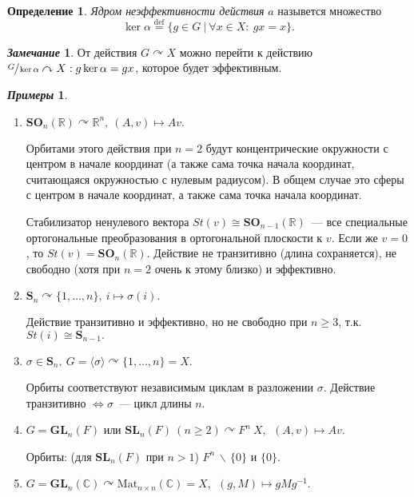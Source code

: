 \documentclass[a4paper, 14pt]{extarticle}
\newcommand{\deq}{\stackrel{\mathrm{def}}{=}}
\newcommand{\n}{\par}
\newcommand{\real}{\mathbb{R}}
\newcommand{\complex}{\mathbb{C}}
\newcommand{\GL}{\mathbf{GL}}
\newcommand{\SL}{\mathbf{SL}}
\newcommand{\SOrth}{\mathbf{SO}}
\newcommand{\symmetrical}{\mathbf{S}}
\newcommand{\suchthat}{{:}{ } \ }
\theoremstyle{definition}
\newtheorem*{exmpls}{\textit{Примеры}}
\newtheorem*{remark}{\textit{Замечание}}
\newtheorem{definition}{Определение}
\theoremstyle{plain}
\numberwithin{theorem}{section}
\numberwithin{definition}{section}
\numberwithin{statement}{section}
\numberwithin{lemma}{section}
\numberwithin{consequence}{section}
\begin{document}
        \begin{definition}
            \textit{Ядром неэффективности действия} $a$ назывется множество 
            \begin{equation*}
                \ker \alpha \deq \{g \in G \ | \ \forall x \in X\suchthat gx = x\}.
            \end{equation*}
        \end{definition}
        \begin{remark}
            От действия ${G \curvearrowright X}$ можно перейти к действию ${\sfrac{G}{\ker \alpha} \curvearrowright X : g \ker \alpha = gx}$, которое будет эффективным.
        \end{remark}
        \begin{exmpls}
            \
            \begin{enumerate}
                \setlength\itemsep{0.1em}
                \item ${\SOrth_n(\real) \curvearrowright \real^n, \ (A,v) \mapsto Av.}$\n
                Орбитами этого действия при ${n = 2}$ будут концентрические окружности с центром в начале координат (а также сама точка начала координат, считающаяся окружностью с нулевым радиусом). В общем случае это сферы с центром в начале координат, а также сама точка начала координат.\n
                Стабилизатор ненулевого вектора ${St(v) \cong \SOrth_{n - 1}(\real)}$~--- все специальные ортогональные преобразования в ортогональной плоскости к $v$. Если же $v = 0$, то $St(v) = \SOrth_n(\real)$.
                Действие не транзитивно (длина сохраняется), не свободно (хотя при ${n = 2}$ очень к этому близко) и эффективно.
                \item ${\symmetrical_n \curvearrowright \{1,\ldots, n\}, \ i \mapsto \sigma(i)}.$ \n
                Действие транзитивно и эффективно, но не свободно при $n \geqslant 3$, т.к. ${St(i) \cong \symmetrical_{n-1}.}$ 
                \item ${\sigma \in \symmetrical_n, \ G = \langle \sigma \rangle \curvearrowright \{1,\ldots, n\} = X.}$\n
                Орбиты соответствуют независимым циклам в разложении $\sigma$.\newline
                Действие транзитивно $\Leftrightarrow \sigma$~--- цикл длины $n$.
                \item ${G = \GL_n(F)}$ или ${\SL_n(F) \ (n \geqslant 2) \curvearrowright F^n \ X, \ \ (A,v) \mapsto Av.}$\n
                Орбиты: (для ${\SL_n(F)}$ при ${n > 1}$) ${F^n \, \backslash \, \{0\}}$ и $\{0\}$.
                \item ${G = \GL_n(\complex) \curvearrowright \mathrm{Mat}_{n \times n}(\complex) = X, \ \ (g,M) \mapsto gMg^{-1}.}$\n

\end{enumerate}
\end{exmpls}
\end{document}

